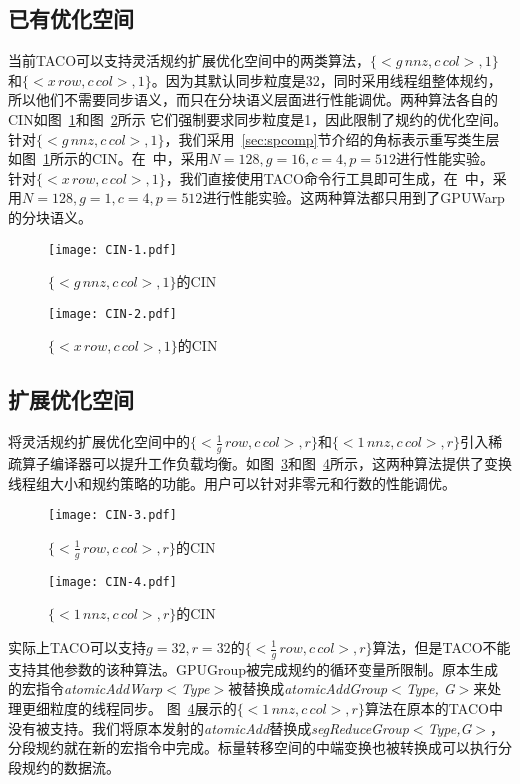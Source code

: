 \subsection{已有优化空间}
当前TACO可以支持灵活规约扩展优化空间中的两类算法，$\{<g\,nnz, c\,col>,1\}$和$\{<x\,row,c\,col >,1\}$。因为其默认同步粒度是32，同时采用线程组整体规约，所以他们不需要同步语义，而只在分块语义层面进行性能调优。两种算法各自的CIN如图~\ref{fig:CIN-1}和图~\ref{fig:CIN-2}所示
它们强制要求同步粒度是1，因此限制了规约的优化空间。针对$\{<g\,nnz, c\,col>,1\}$，我们采用~\ref{sec:spcomp}节介绍的角标表示重写类生层如图~\ref{fig:CIN-1}所示的CIN。在~\cite{senanayake:2020:scheduling}中，采用$N=128,g=16,c=4,p=512$进行性能实验。
针对$\{<x\,row,c\,col >,1\}$，我们直接使用TACO命令行工具即可生成，在~\cite{senanayake:2020:scheduling}中，采用$N=128,g=1,c=4,p=512$进行性能实验。这两种算法都只用到了GPUWarp的分块语义。
\begin{figure}[h]%
  \centering
  \texttt{[image: CIN-1.pdf]}
  \caption{$\{<g\,nnz, c\,col>,1\}$的CIN}\label{fig:CIN-1}
\end{figure}
\begin{figure}[h]%
  \centering
  \texttt{[image: CIN-2.pdf]}
  \caption{$\{<x\,row,c\,col >,1\}$的CIN}\label{fig:CIN-2}
\end{figure}
\subsection{扩展优化空间}\label{sec:comp-space}
将灵活规约扩展优化空间中的$\{<\frac{1}{g}\,row, c\,col>,r\}$和$\{<1\,nnz , c\,col>,r\}$引入稀疏算子编译器可以提升工作负载均衡。如图~\ref{fig:CIN-3}和图~\ref{fig:CIN-4}所示，这两种算法提供了变换线程组大小和规约策略的功能。用户可以针对非零元和行数的性能调优。
\begin{figure}[h]%
  \centering
  \texttt{[image: CIN-3.pdf]}
  \caption{$\{<\frac{1}{g}\,row, c\,col>,r\}$的CIN}\label{fig:CIN-3}
\end{figure}
\begin{figure}[h]%
  \centering
  \texttt{[image: CIN-4.pdf]}
  \caption{$\{<1\,nnz , c\,col>,r\}$的CIN}\label{fig:CIN-4}
\end{figure}
实际上TACO可以支持$g=32, r=32$的$\{<\frac{1}{g}\,row, c\,col>,r\}$算法，但是TACO不能支持其他参数的该种算法。GPUGroup被完成规约的循环变量所限制。原本生成的宏指令\textit{atomicAddWarp$<$Type$>$}被替换成\textit{atomicAddGroup$<$Type, G$>$}来处理更细粒度的线程同步。
图~\ref{fig:CIN-4}展示的$\{<1\,nnz , c\,col>,r\}$算法在原本的TACO中没有被支持。我们将原本发射的\textit{atomicAdd}替换成\textit{segReduceGroup$<$Type,G$>$}，分段规约就在新的宏指令中完成。标量转移空间的中端变换也被转换成可以执行分段规约的数据流。


